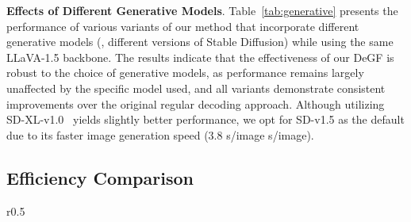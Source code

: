 \textbf{Effects of Different Generative Models}. Table~\ref{tab:generative} presents the performance of various variants of our method that incorporate different generative models (\ie, different versions of Stable Diffusion) while using the same LLaVA-1.5 backbone. The results indicate that the effectiveness of our DeGF is robust to the choice of generative models, as performance remains largely unaffected by the specific model used, and all variants demonstrate consistent improvements over the original regular decoding approach.
Although utilizing SD-XL-v1.0~\citep{podell2024sdxl} yields slightly better performance, we opt for SD-v1.5 as the default due to its faster image generation speed (3.8 s/image  s/image).

\subsection{Efficiency Comparison}
\begin{wraptable}[11]{r}{0.5\textwidth}
\small
\begin{center}
\vspace{-16pt}
\caption{}
\label{tab:efficiency}
\vspace{-5pt}
\end{center}
\end{wraptable}

